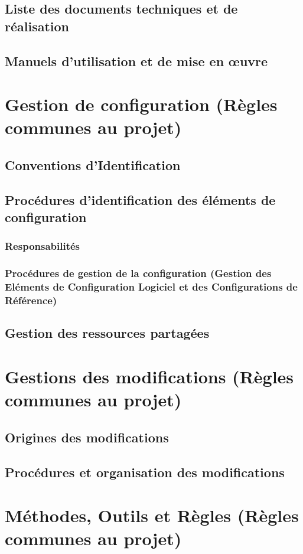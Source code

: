 \subsection{Liste des documents techniques et de réalisation}
\subsection{Manuels d’utilisation et de mise en œuvre}

\section{Gestion de configuration (Règles communes au projet)}
\subsection{Conventions d’Identification}
\subsection{Procédures d’identification des éléments de configuration} 
\subsubsection{Responsabilités}
\subsubsection{Procédures de gestion de la configuration (Gestion des Eléments de Configuration Logiciel et des Configurations de Référence)}
\subsection{Gestion des ressources partagées}
\section{Gestions des modifications  (Règles communes au projet)}
\subsection{Origines des modifications}
\subsection{Procédures et organisation des modifications}

\section{Méthodes, Outils et Règles (Règles communes au projet)}
